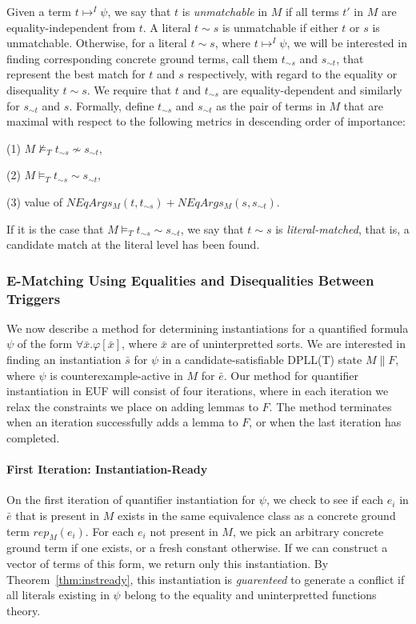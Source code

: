 \documentclass{llncs}
\begin{document}
Given a term $t \mapsto^I \psi$, we say that $t$ is \emph{unmatchable} in $M$ if all terms $t'$ in $M$ are equality-independent from $t$.
A literal $t \sim s$ is unmatchable if either $t$ or $s$ is unmatchable.
Otherwise, for a literal $t \sim s$, where $t \mapsto^I \psi$, we will be interested in finding corresponding concrete ground terms, call them $t_{\sim s}$ and $s_{\sim t}$, that represent the best match for $t$ and $s$ respectively, with regard to the equality or disequality $t \sim s$.
We require that $t$ and $t_{\sim s}$ are equality-dependent and similarly for $s_{\sim t}$ and $s$.
Formally, define $t_{\sim s}$ and $s_{\sim t}$ as the pair of terms in $M$ that are maximal with respect to the following metrics in descending order of importance: 

(1) $M \not\models_T t_{\sim s} \not\sim s_{\sim t}$, 

(2) $M \models_T t_{\sim s} \sim s_{\sim t}$,

(3) value of $NEqArgs_M( t, t_{\sim s} ) + NEqArgs_M( s, s_{\sim t} )$.

If it is the case that $M \models_T t_{\sim s} \sim s_{\sim t}$, we say that $t \sim s$ is \emph{literal-matched}, that is, a candidate match at the literal level has been found.

\subsubsection{E-Matching Using Equalities and Disequalities Between Triggers}

We now describe a method for determining instantiations for a quantified formula $\psi$ of the form $\forall \bar{x}. \varphi[\bar{x}]$, where $\bar{x}$ are of uninterpretted sorts.
We are interested in finding an instantiation $\bar{s}$ for $\psi$ in a candidate-satisfiable DPLL(T) state $M \parallel F$, where $\psi$ is counterexample-active in $M$ for $\bar{e}$.
Our method for quantifier instantiation in EUF will consist of four iterations, where in each iteration we relax the constraints we place on adding lemmas to $F$.
The method terminates when an iteration successfully adds a lemma to $F$, or when the last iteration has completed.

\paragraph{First Iteration: Instantiation-Ready}

On the first iteration of quantifier instantiation for $\psi$, we check to see if each $e_i$ in $\bar{e}$ that is present in $M$ exists in the same equivalence class as a concrete ground term $rep_M(e_i)$.
For each $e_i$ not present in $M$, we pick an arbitrary concrete ground term if one exists, or a fresh constant otherwise.
If we can construct a vector of terms of this form, we return only this instantiation.
By Theorem~\ref{thm:instready}, this instantiation is \emph{guarenteed} to generate a conflict if all literals existing in $\psi$ belong to the equality and uninterpretted functions theory.
\end{document}
